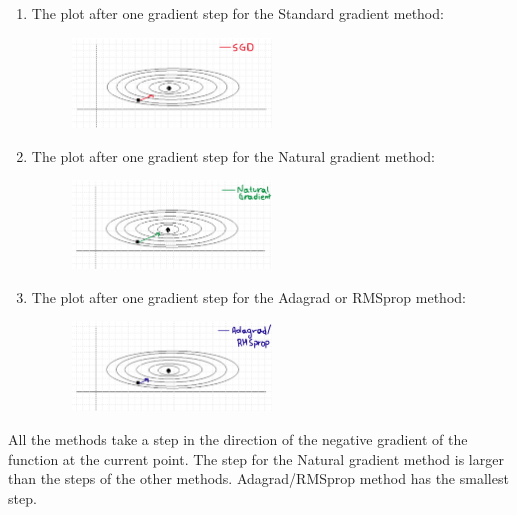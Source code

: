 \documentclass{article}
\begin{document}
\begin{enumerate}
  \item The plot after one gradient step for the Standard gradient method:
        \begin{figure}[h]
          \centering
          \includegraphics[width=0.5\textwidth]{pr9_a.png}
          
        \end{figure}
        
  \item The plot after one gradient step for the Natural gradient method:
        \begin{figure}[h]
          \centering
          \includegraphics[width=0.5\textwidth]{pr9_b.png}
          
        \end{figure}
  \item The plot after one gradient step for the Adagrad or RMSprop method:
        \begin{figure}[h]
          \centering
          \includegraphics[width=0.5\textwidth]{pr9_c.png}
          
        \end{figure}
\end{enumerate}
\noindent All the methods take a step in the direction of the negative gradient 
of the function at the current point. The step for the Natural gradient method is larger than the steps of the other methods. Adagrad/RMSprop method has the smallest step.
\end{document}
